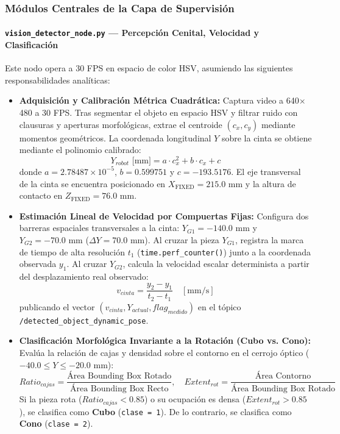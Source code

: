 \documentclass[12pt, a4paper]{report}
\begin{document}
\subsubsection{Módulos Centrales de la Capa de Supervisión}

\paragraph{\texttt{vision\_detector\_node.py} --- Percepción Cenital, Velocidad y Clasificación}
Este nodo opera a 30 FPS en espacio de color HSV, asumiendo las siguientes responsabilidades analíticas:
\begin{itemize}
    \item \textbf{Adquisición y Calibración Métrica Cuadrática:} 
    Captura video a 640$\times$480 a 30 FPS. Tras segmentar el objeto en espacio HSV y filtrar ruido con clausuras y aperturas morfológicas, extrae el centroide $(c_x, c_y)$ mediante momentos geométricos. La coordenada longitudinal $Y$ sobre la cinta se obtiene mediante el polinomio calibrado:
    \begin{equation}
        Y_{robot}\text{ [mm]} = a \cdot c_x^2 + b \cdot c_x + c
    \end{equation}
    donde $a = 2.78487 \times 10^{-5}$, $b = 0.599751$ y $c = -193.5176$. El eje transversal de la cinta se encuentra posicionado en $X_{\text{FIXED}} = 215.0\text{ mm}$ y la altura de contacto en $Z_{\text{FIXED}} = 76.0\text{ mm}$.
    
    \item \textbf{Estimación Lineal de Velocidad por Compuertas Fijas:}
    Configura dos barreras espaciales transversales a la cinta: $Y_{G1} = -140.0\text{ mm}$ y $Y_{G2} = -70.0\text{ mm}$ ($\Delta Y = 70.0\text{ mm}$). Al cruzar la pieza $Y_{G1}$, registra la marca de tiempo de alta resolución $t_1$ (\texttt{time.perf\_counter()}) junto a la coordenada observada $y_1$. Al cruzar $Y_{G2}$, calcula la velocidad escalar determinista a partir del desplazamiento real observado:
    \begin{equation}
        v_{cinta} = \frac{y_2 - y_1}{t_2 - t_1} \quad [\text{mm/s}]
    \end{equation}
    publicando el vector $(v_{cinta}, Y_{actual}, flag_{medido})$ en el tópico \texttt{/detected\_object\_dynamic\_pose}.

    \item \textbf{Clasificación Morfológica Invariante a la Rotación (Cubo vs. Cono):}
    Evalúa la relación de cajas y densidad sobre el contorno en el cerrojo óptico ($-40.0 \le Y \le -20.0\text{ mm}$):
    \begin{equation}
        Ratio_{cajas} = \frac{\text{Área Bounding Box Rotado}}{\text{Área Bounding Box Recto}}, \quad Extent_{rot} = \frac{\text{Área Contorno}}{\text{Área Bounding Box Rotado}}
    \end{equation}
    Si la pieza rota ($Ratio_{cajas} < 0.85$) o su ocupación es densa ($Extent_{rot} > 0.85$), se clasifica como \textbf{Cubo} (\texttt{clase = 1}). De lo contrario, se clasifica como \textbf{Cono} (\texttt{clase = 2}).
\end{itemize}
\end{document}
